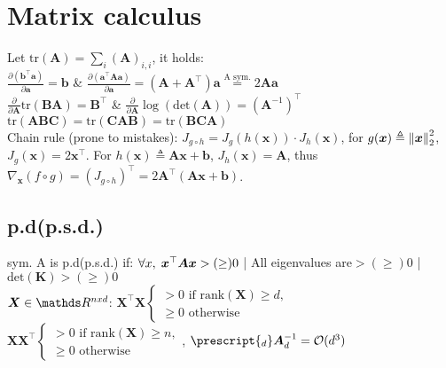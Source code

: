 \section{Matrix calculus}
Let $\text{tr}(\bm{A})=\sum_{i}(\bm{A})_{i,i}$, it holds:\\
  $\frac{\partial(\bm{b}^{\top}\bm{a})}{\partial \bm{a}}=\bm{b}$ & $\frac{\partial(\bm{a}^{\top}\bm{Aa})}{\partial \bm{a}} = (\bm{A} + \bm{A}^{\top})\bm{a}
\overset{\text{A sym.}}{=} 2\bm{A}\bm{a}$\\
  $\frac{\partial}{\partial \bm{A}}\text{tr}(\bm{BA})=\bm{B}^{\top}$ & $\frac{\partial}{\partial \bm{A}}\log(\text{det}(\bm{A})) = (\bm{A}^{-1})^{\top}$
  $\text{tr}(\bm{ABC}) = \text{tr}(\bm{CAB}) = \text{tr}(\bm{BCA})$\\
Chain rule (prone to mistakes): $J_{g \circ h} = J_{g}(h(\bm{x})) \cdot J_{h}(\bm{x})$,
for $g(\bm{x}) \triangleq \left\lVert\bm{x}\right\rVert_{2}^{2}$, $J_{g}(\bm{x}) = 2\bm{x}^{\top}$.
For $h(\bm{x}) \triangleq \bm{A}\bm{x} + \bm{b}$, $J_{h}(\bm{x}) = \bm{A}$,
thus $\nabla_{\bm{x}} (f\circ g) = (J_{g \circ h})^{\top} = 2\bm{A}^{\top}(\bm{Ax}+\bm{b})$.
\subsection{p.d(p.s.d.)}
sym. A is p.d(p.s.d.) if:
$\Forall {x} \bm{x}^{\top}\bm{A}\bm{x} >(\geq) 0$ | All eigenvalues are$>(\geq)0$ | $\text{det}(\bm{K}) >(\geq) 0$\\
$\bm{X}\in \R^{nxd}$: $\bm{X}^{\top}\bm{X} \begin{cases} > 0 \text{ if rank}(\bm{X}) \geq d, \\
\geq 0 \text{ otherwise}\end{cases}$
$\bm{X}\bm{X}^{\top} \begin{cases} > 0 \text{ if rank}(\bm{X}) \geq n, \\
\geq 0 \text{ otherwise}\end{cases}$, $\prescript{_{d}}\bm{A}_{d}^{-1}=\mathcal{O}(d^{3})$
